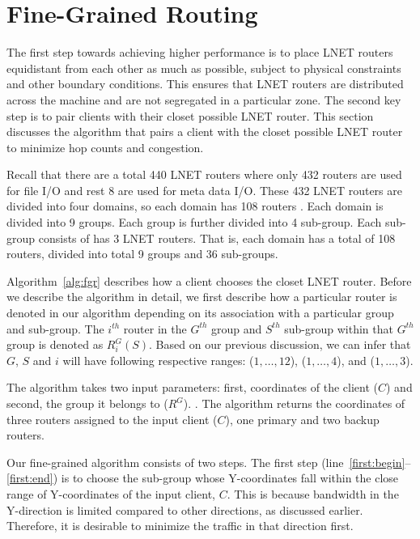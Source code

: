 \section{Fine-Grained Routing}


The first step towards achieving higher performance is to place LNET routers equidistant from each other as much as possible,
subject to physical constraints and other boundary conditions. This ensures that LNET routers are distributed across the machine
and are not segregated in a particular zone. The second key step is to pair clients with their closet possible LNET router. This 
section discusses the algorithm that pairs a client with the closet possible LNET router to minimize hop counts and congestion.

Recall that there are a total 440 LNET routers where only 432 routers are used for file I/O and rest 8 are used for meta data I/O.
These 432 LNET routers are divided into four domains, so each domain has 108 routers . Each
domain is divided into 9 groups. Each group is further divided into 4 sub-group. Each sub-group consists of has 3 LNET routers. That 
is, each domain has a total of 108 routers, divided into total 9 groups and 36 sub-groups.


Algorithm~\ref{alg:fgr} describes how a client chooses the closet LNET router. Before we describe the algorithm in detail, we first
describe how a particular router is denoted in our algorithm depending on its association with a particular group and sub-group. The 
$i^{th}$ router in the $G^{th}$ group and $S^{th}$ sub-group within that $G^{th}$ group is denoted as $R^G_{i}(S)$. Based on 
our previous discussion, we can infer that $G$, $S$ and $i$ will have following respective ranges: ($1, \dots, 12$), ($1, \dots, 4$), 
and ($1, \dots, 3$).

The algorithm takes two input parameters: first, coordinates of the client ($C$) and second, the group it belongs to ($R^G$). . The algorithm returns the coordinates of three routers assigned to the input client ($C$),
one primary and two backup routers.

Our fine-grained algorithm consists of two steps. The first step (line~\ref{first:begin}--\ref{first:end}) is to choose the sub-group whose 
Y-coordinates fall within the close range of Y-coordinates of the input client, $C$. This is because bandwidth in the Y-direction is limited
compared to other directions, as discussed earlier. Therefore, it is desirable to minimize the traffic in that direction first. 

